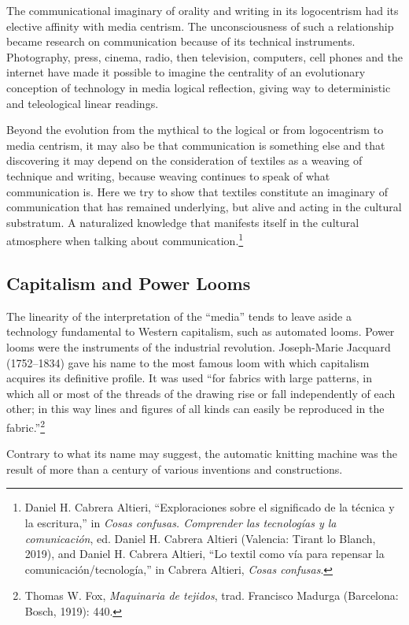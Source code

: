 \documentclass{tufte-handout}
\begin{document}
The communicational imaginary of orality and writing in its logocentrism
had its elective affinity with media centrism. The unconsciousness of
such a relationship became research on communication because of its
technical instruments. Photography, press, cinema, radio, then
television, computers, cell phones and the internet have made it
possible to imagine the centrality of an evolutionary conception of
technology in media logical reflection, giving way to deterministic and
teleological linear readings.

Beyond the evolution from the mythical to the logical or from
logocentrism to media centrism, it may also be that communication is
something else and that discovering it may depend on the consideration
of textiles as a weaving of technique and writing, because weaving
continues to speak of what communication is. Here we try to show that
textiles constitute an imaginary of communication that has remained
underlying, but alive and acting in the cultural substratum. A
naturalized knowledge that manifests itself in the cultural atmosphere
when talking about communication.\footnote{Daniel H. Cabrera Altieri,
  ``Exploraciones sobre el significado de la técnica y la escritura,''
  in \emph{Cosas confusas. Comprender las tecnologías y la
  comunicación}, ed. Daniel H. Cabrera Altieri (Valencia: Tirant lo
  Blanch, 2019), and Daniel H. Cabrera Altieri, ``Lo textil como vía
  para repensar la comunicación/tecnología,'' in Cabrera Altieri,
  \emph{Cosas confusas}.}

\hypertarget{capitalism-and-power-looms}{%
\subsection{Capitalism and Power
Looms}\label{capitalism-and-power-looms}}

The linearity of the interpretation of the ``media'' tends to leave
aside a technology fundamental to Western capitalism, such as automated
looms. Power looms were the instruments of the industrial revolution.
Joseph-Marie Jacquard (1752--1834) gave his name to the most famous loom
with which capitalism acquires its definitive profile. It was used ``for
fabrics with large patterns, in which all or most of the threads of the
drawing rise or fall independently of each other; in this way lines and
figures of all kinds can easily be reproduced in the
fabric.''\footnote{Thomas W. Fox, \emph{Maquinaria de tejidos}, trad.
  Francisco Madurga (Barcelona: Bosch, 1919): 440.}

Contrary to what its name may suggest, the automatic knitting machine
was the result of more than a century of various inventions and
constructions.
\end{document}
